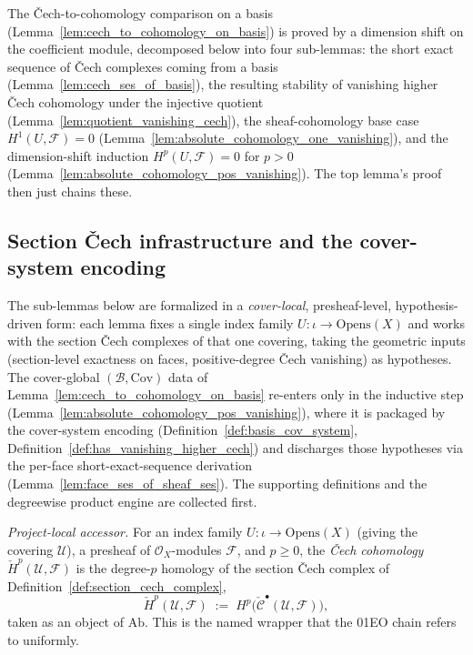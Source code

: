 The {\v C}ech-to-cohomology comparison on a basis
(Lemma~\ref{lem:cech_to_cohomology_on_basis}) is proved by a dimension shift on the
coefficient module, decomposed below into four sub-lemmas: the short exact sequence of
{\v C}ech complexes coming from a basis (Lemma~\ref{lem:cech_ses_of_basis}), the
resulting stability of vanishing higher {\v C}ech cohomology under the injective
quotient (Lemma~\ref{lem:quotient_vanishing_cech}), the sheaf-cohomology base case
\(H^1(U, \mathcal{F}) = 0\) (Lemma~\ref{lem:absolute_cohomology_one_vanishing}), and the
dimension-shift induction \(H^p(U, \mathcal{F}) = 0\) for \(p > 0\)
(Lemma~\ref{lem:absolute_cohomology_pos_vanishing}). The top lemma's proof then just
chains these.

\subsection{Section {\v C}ech infrastructure and the cover-system encoding}

The sub-lemmas below are formalized in a \emph{cover-local}, presheaf-level, hypothesis-driven
form: each lemma fixes a single index family \(U : \iota \to \mathrm{Opens}(X)\) and works with the
section {\v C}ech complexes of that one covering, taking the geometric inputs (section-level
exactness on faces, positive-degree {\v C}ech vanishing) as hypotheses. The cover-global
\((\mathcal{B}, \mathrm{Cov})\) data of Lemma~\ref{lem:cech_to_cohomology_on_basis} re-enters only
in the inductive step (Lemma~\ref{lem:absolute_cohomology_pos_vanishing}), where it is packaged by
the cover-system encoding (Definition~\ref{def:basis_cov_system},
Definition~\ref{def:has_vanishing_higher_cech}) and discharges those hypotheses via the per-face
short-exact-sequence derivation (Lemma~\ref{lem:face_ses_of_sheaf_ses}). The supporting
definitions and the degreewise product engine are collected first.

\begin{definition}

  \label{def:cech_cohomology_accessor}
  \textit{Project-local accessor.}
  For an index family \(U : \iota \to \mathrm{Opens}(X)\) (giving the covering \(\mathcal{U}\)), a
  presheaf of \(\mathcal{O}_X\)-modules \(\mathcal{F}\), and \(p \geq 0\), the \emph{{\v C}ech
  cohomology} \(\check{H}^p(\mathcal{U}, \mathcal{F})\) is the degree-\(p\) homology of the section
  {\v C}ech complex of Definition~\ref{def:section_cech_complex},
  \[
    \check{H}^p(\mathcal{U}, \mathcal{F}) \;:=\;
      H^p\bigl(\check{\mathcal{C}}^\bullet(\mathcal{U}, \mathcal{F})\bigr),
  \]
  taken as an object of \(\mathrm{Ab}\). This is the named wrapper that the 01EO chain refers to
  uniformly.
\end{definition}

